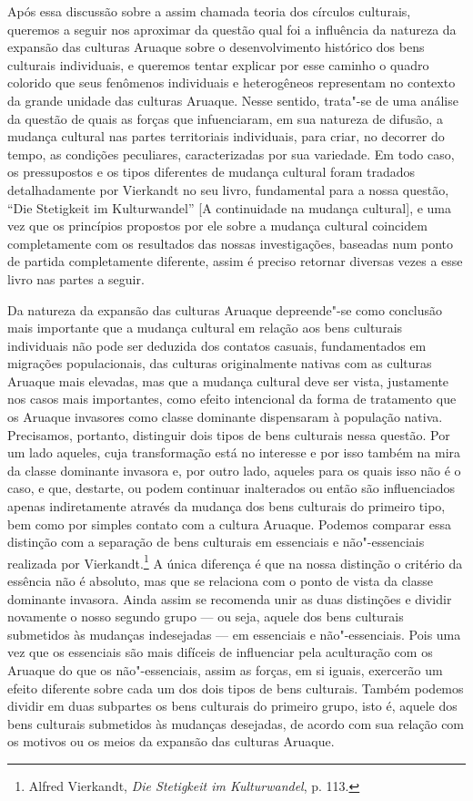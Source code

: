 Após essa discussão sobre a assim chamada teoria dos círculos
culturais, queremos a seguir nos aproximar da questão qual foi a
influência da natureza da expansão das culturas Aruaque sobre o
desenvolvimento histórico dos bens culturais individuais, e queremos
tentar explicar por esse caminho o quadro colorido que seus fenômenos
individuais e heterogêneos representam no contexto da grande unidade
das culturas Aruaque. Nesse sentido, trata"-se de uma análise da questão
de quais as forças que infuenciaram, em sua natureza de difusão, a
mudança cultural nas partes territoriais individuais, para criar, no
decorrer do tempo, as condições peculiares, caracterizadas por sua
variedade. Em todo caso, os pressupostos e os tipos diferentes de
mudança cultural foram tradados detalhadamente por Vierkandt no seu
livro, fundamental para a nossa questão, ``Die Stetigkeit im
Kulturwandel'' {[}A continuidade na mudança cultural{]}, e uma vez que
os princípios propostos por ele sobre a mudança cultural coincidem
completamente com os resultados das nossas investigações, baseadas num
ponto de partida completamente diferente, assim é preciso retornar
diversas vezes a esse livro nas partes a seguir.

Da natureza da expansão das culturas Aruaque depreende"-se como
conclusão mais importante que a mudança cultural em relação aos bens
culturais individuais não pode ser deduzida dos contatos casuais,
fundamentados em migrações populacionais, das culturas originalmente
nativas com as culturas Aruaque mais elevadas, mas que a mudança
cultural deve ser vista, justamente nos casos mais importantes, como
efeito intencional da forma de tratamento que os Aruaque invasores como
classe dominante dispensaram à população nativa. Precisamos, portanto,
distinguir dois tipos de bens culturais nessa questão. Por um lado
aqueles, cuja transformação está no interesse e por isso também na mira
da classe dominante invasora e, por outro lado, aqueles para os quais
isso não é o caso, e que, destarte, ou podem continuar inalterados ou
então são influenciados apenas indiretamente através da mudança dos bens
culturais do primeiro tipo, bem como por simples contato com a cultura
Aruaque. Podemos comparar essa distinção com a separação de bens
culturais em essenciais e não"-essenciais realizada por
Vierkandt.\footnote{Alfred Vierkandt, \emph{Die Stetigkeit im
  Kulturwandel}, p. 113.} A única diferença é que na nossa distinção o
critério da essência não é absoluto, mas que se relaciona com o ponto de
vista da classe dominante invasora. Ainda assim se recomenda unir as
duas distinções e dividir novamente o nosso segundo grupo --- ou seja,
aquele dos bens culturais submetidos às mudanças indesejadas --- em
essenciais e não"-essenciais. Pois uma vez que os essenciais são mais
difíceis de influenciar pela aculturação com os Aruaque do que os
não"-essenciais, assim as forças, em si iguais, exercerão um efeito
diferente sobre cada um dos dois tipos de bens culturais. Também podemos
dividir em duas subpartes os bens culturais do primeiro grupo, isto é,
aquele dos bens culturais submetidos às mudanças desejadas, de acordo
com sua relação com os motivos ou os meios da expansão das culturas
Aruaque.

